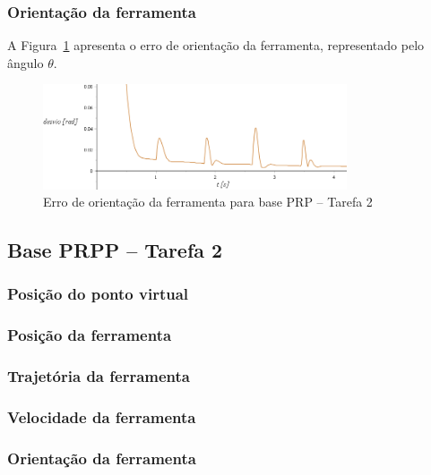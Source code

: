 \subsubsection{Orientação da ferramenta}

A Figura~\ref{fig::t2_erroori_base_prp} apresenta o erro de orientação da
ferramenta, representado pelo ângulo $\theta$.

\begin{figure}[h!]
	\centering 
 	\includegraphics[width=0.80\textwidth]{figs/t2_erroori_base_prp}
 	\caption{Erro de orientação da ferramenta para base PRP -- Tarefa
 	2}
 	\label{fig::t2_erroori_base_prp}
\end{figure}



\subsection{Base PRPP -- Tarefa 2}

\subsubsection{Posição do ponto virtual}

\subsubsection{Posição da ferramenta}

\subsubsection{Trajetória da ferramenta}

\subsubsection{Velocidade da ferramenta}

\subsubsection{Orientação da ferramenta}

